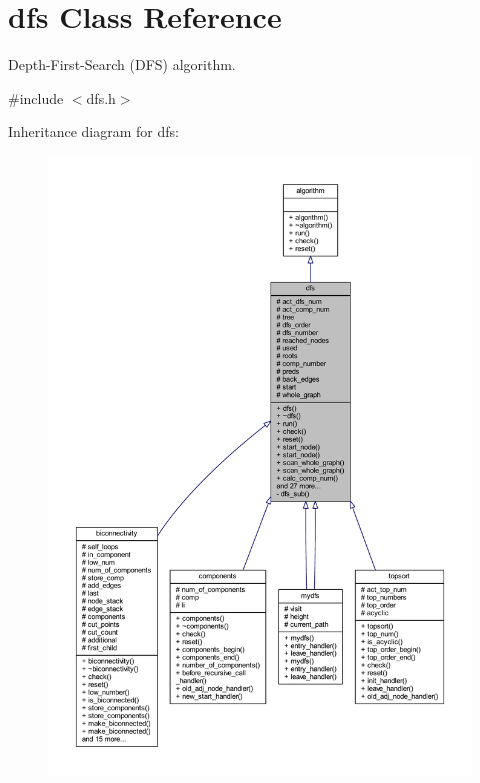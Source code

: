 \hypertarget{classdfs}{}\section{dfs Class Reference}
\label{classdfs}


Depth-\/\+First-\/\+Search (D\+FS) algorithm.  




{\ttfamily \#include $<$dfs.\+h$>$}



Inheritance diagram for dfs\+:\nopagebreak
\begin{figure}[H]
\begin{center}
\leavevmode
\includegraphics[width=350pt]{classdfs__inherit__graph}
\end{center}
\end{figure}


